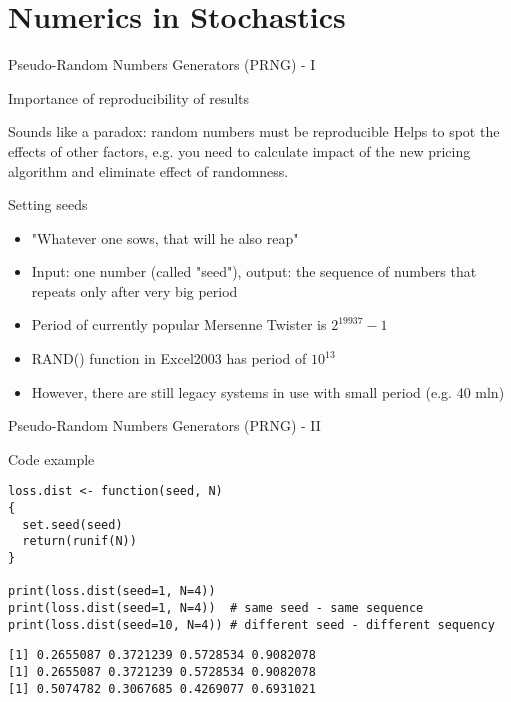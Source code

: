 \documentclass[presentation]{beamer}
\begin{document}
\section{Numerics in Stochastics}
\label{sec-3}
\begin{frame}[label=sec-3-1]{Pseudo-Random Numbers Generators (PRNG) - I}
\begin{block}{Importance of reproducibility of results}
\begin{block}{Sounds like a paradox: random numbers must be reproducible}
Helps to spot the effects of other factors, e.g. you need to calculate impact of the new pricing algorithm and eliminate effect of randomness.
\end{block}
\end{block}
\begin{block}{Setting seeds}
\begin{itemize}
\item "Whatever one sows, that will he also reap"
\item Input: one number (called "seed"), output: the sequence of numbers that repeats only after very big period
\item Period of currently popular Mersenne Twister is $2^{19937} - 1$
\item RAND() function in Excel2003 has period of $10^{13}$
\item However, there are still legacy systems in use with small period (e.g. 40 mln)
\end{itemize}
\end{block}
\end{frame}
\begin{frame}[fragile,label=sec-3-2]{Pseudo-Random Numbers Generators (PRNG) - II}
 \begin{block}{Code example}
\begin{verbatim}
loss.dist <- function(seed, N)
{
  set.seed(seed)
  return(runif(N))
}

print(loss.dist(seed=1, N=4))
print(loss.dist(seed=1, N=4))  # same seed - same sequence
print(loss.dist(seed=10, N=4)) # different seed - different sequency
\end{verbatim}

\begin{verbatim}
[1] 0.2655087 0.3721239 0.5728534 0.9082078
[1] 0.2655087 0.3721239 0.5728534 0.9082078
[1] 0.5074782 0.3067685 0.4269077 0.6931021
\end{verbatim}
\end{block}
\end{frame}
\end{document}
